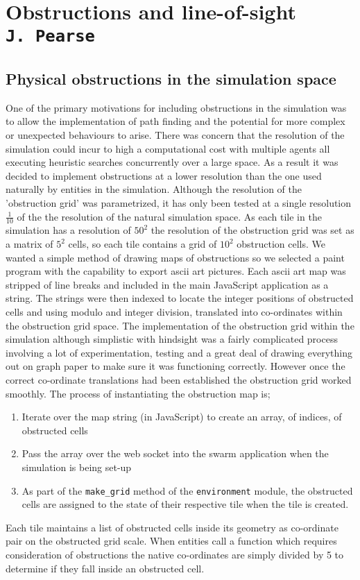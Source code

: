 \pagestyle{empty}

\section{Obstructions and line-of-sight\\{\small\tt{J.~Pearse}}}
\label{los}
\subsection{Physical obstructions in the simulation space}
One of the primary motivations for including obstructions in the simulation was to allow the implementation of path finding and the potential for more complex or unexpected behaviours to arise. There was concern that the resolution of the simulation could incur to high a computational cost with multiple agents all executing heuristic searches concurrently over a large space. As a result it was decided to implement obstructions at a lower resolution than the one used naturally by entities in the simulation. Although the resolution of the 'obstruction grid' was parametrized, it has only been tested at a single resolution \(\frac{1}{10}\) of the the resolution of the natural simulation space.
As each tile in the simulation has a resolution of \(50^2\) the resolution of the obstruction grid was set as a matrix of \(5^2\) cells, so each tile contains a grid of \(10^2\) obstruction cells. We wanted a simple method of drawing maps of obstructions so we selected a paint program with the capability to export ascii art pictures. Each ascii art map was stripped of line breaks and included in the main JavaScript application as a string. The strings were then indexed to locate the integer positions of obstructed cells and using modulo and integer division, translated into co-ordinates within the obstruction grid space. The implementation of the obstruction grid within the simulation although simplistic with hindsight was a fairly complicated process involving a lot of experimentation, testing and a great deal of drawing everything out on graph paper to make sure it was functioning correctly. However once the correct co-ordinate translations had been established the obstruction grid worked smoothly.
The process of instantiating the obstruction map is;
\begin{enumerate}
\item{Iterate over the map string (in JavaScript) to create an array, of indices, of obstructed cells}
\item{Pass the array over the web socket into the swarm application when the simulation is being set-up}
\item{As part of the \verb+make_grid+ method of the \verb+environment+ module, the obstructed cells are assigned to the state of their respective tile when the tile is created.}
\end{enumerate}
Each tile maintains a list of obstructed cells inside its geometry as co-ordinate pair on the obstructed grid scale.
When entities call a function which requires consideration of obstructions the native co-ordinates are simply divided by 5 to determine if they fall inside an obstructed cell.

